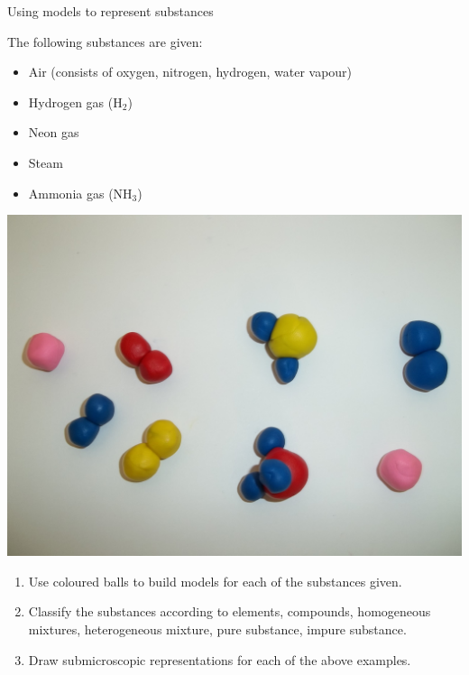 \begin{activity}{Using models to represent substances}{
\begin{minipage}{.5\textwidth}
The following substances are given:
\label{m38708*eip-id1166921187210}
\begin{itemize}[noitemsep]
    \item Air (consists of oxygen, nitrogen, hydrogen, water vapour)
    \item Hydrogen gas ($\text{H}_2$)
    \item Neon gas
    \item Steam
    \item Ammonia gas ($\text{NH}_3$)
\end{itemize}
\end{minipage}
\begin{minipage}{.5\textwidth}
\begin{center}
 \includegraphics[width=.8\textwidth]{photos/models_classification.jpg}\par
\end{center}
\end{minipage}
\noindent
\begin{enumerate}[noitemsep, label=\textbf{\arabic*}.]
\item Use coloured balls to build models for each of the substances given.
\item Classify the substances according to elements, compounds, homogeneous mixtures, heterogeneous mixture, pure substance, impure substance.
\item Draw submicroscopic representations for each of the above examples.
\end{enumerate}

}
\end{activity}

